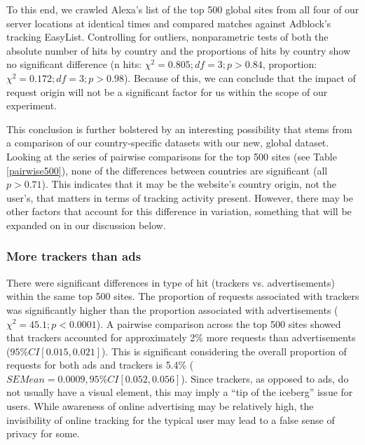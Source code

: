 \documentclass[conference]{IEEEtran}
\newcommand{\todo}[1]{}
\renewcommand{\todo}[1]{{\color{red} TODO: {#1}}}
\begin{document}
To this end, we crawled Alexa's list of the top 500 global sites from all four of our server locations at identical times and compared matches against Adblock's tracking EasyList. Controlling for outliers, nonparametric tests of both the absolute number of hits by country and the proportions of hits by country show no significant difference (n hits: $\chi^{2}=0.805; df=3; p>0.84$, proportion: $\chi^{2}=0.172; df=3; p>0.98$). Because of this, we can conclude that the impact of request origin will not be a significant factor for us within the scope of our experiment.  

This conclusion is further bolstered by an interesting possibility that stems from a comparison of our country-specific datasets with our new, global dataset. Looking at the series of pairwise comparisons for the top 500 sites (see Table \ref{pairwise500}), none of the differences between countries are significant (all $p>0.71$). This indicates that it may be the website's country origin, not the user's, that matters in terms of tracking activity present. However, there may be other factors that account for this difference in variation, something that will be expanded on in our discussion below. 


\subsubsection{More trackers than ads}
There were significant differences in type of hit (trackers vs. advertisements) within the same top 500 sites. The proportion of requests associated with trackers was significantly higher than the proportion associated with advertisements ($\chi^{2}=45.1; p<0.0001$). A pairwise comparison across the top 500 sites showed that trackers accounted for approximately 2\% more requests than advertisements ($95\% CI [0.015, 0.021]$). This is significant considering the overall proportion of requests for both ads and trackers is 5.4\% ($SEMean = 0.0009, 95\% CI [0.052, 0.056]$). Since trackers, as opposed to ads, do not usually have a visual element, this may imply a ``tip of the iceberg'' issue for users. While awareness of online advertising may be relatively high, the invisibility of online tracking for the typical user may lead to a false sense of privacy for some. 

\end{document}
